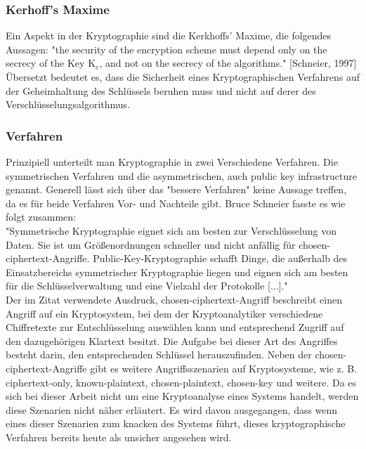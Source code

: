 \documentclass[10pt, a4paper]{scrreprt}
\begin{document}
\subsubsection{Kerhoff's Maxime}
Ein Aspekt in der Kryptographie sind die Kerkhoffs' Maxime, die folgendes Aussagen: "the security of the encryption scheme must depend only on the secrecy of the Key K$_{e}$, and not on the secrecy of the algorithms." [Schneier, 1997] Übersetzt bedeutet es, dass die Sicherheit eines Kryptographischen Verfahrens  auf der Geheimhaltung des Schlüssels beruhen muss und nicht auf derer des Verschlüsselungsalgorithmus.


\subsubsection{Verfahren}
Prinzipiell unterteilt man Kryptographie in zwei Verschiedene Verfahren. Die symmetrischen Verfahren und die asymmetrischen, auch public key infrastructure genannt. Generell lässt sich über das "bessere Verfahren" keine Aussage treffen, da es für beide Verfahren Vor- und Nachteile gibt. Bruce Schneier fasste es wie folgt zusammen: \\
"Symmetrische Kryptographie eignet sich am besten zur Verschlüsselung von Daten. Sie ist um Größenordnungen schneller und nicht anfällig für chosen-ciphertext-Angriffe. Public-Key-Kryptographie schafft Dinge, die außerhalb des Einsatzbereichs symmetrischer Kryptographie liegen und eignen sich am besten für die Schlüsselverwaltung und eine Vielzahl der Protokolle [...]."\\ %
Der im Zitat verwendete Ausdruck, chosen-ciphertext-Angriff beschreibt einen Angriff auf ein Kryptosystem, bei dem der Kryptoanalytiker verschiedene Chiffretexte zur Entschlüsselung auswählen kann und entsprechend Zugriff auf den dazugehörigen Klartext besitzt. Die Aufgabe bei dieser Art des Angriffes besteht darin, den entsprechenden Schlüssel herauszufinden. %
Neben der chosen-ciphertext-Angriffe gibt es weitere Angriffsszenarien auf Kryptosysteme, wie z. B. ciphertext-only, known-plaintext, chosen-plaintext, chosen-key und weitere. Da es sich bei dieser Arbeit nicht um eine Kryptoanalyse eines Systems handelt, werden diese Szenarien nicht näher erläutert. Es wird davon ausgegangen, dass wenn eines dieser Szenarien zum knacken des Systems führt, dieses kryptographische Verfahren bereits heute als unsicher angesehen wird.
\end{document}
